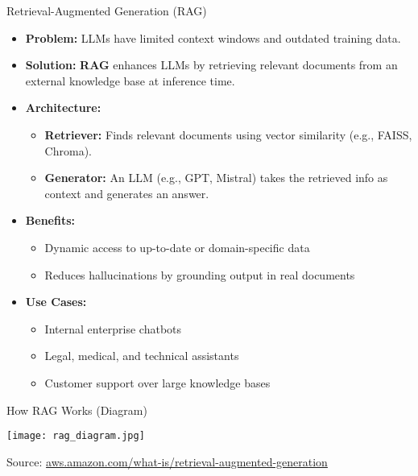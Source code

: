 \documentclass[8pt]{beamer}
\begin{document}
\begin{frame}{Retrieval-Augmented Generation (RAG)}

\begin{itemize}
    \item \textbf{Problem:} LLMs have limited context windows and outdated training data.
    \vspace{0.2cm}
    
    \item \textbf{Solution:} \textbf{RAG} enhances LLMs by retrieving relevant documents from an external knowledge base at inference time.
    \vspace{0.2cm}
    
    \item \textbf{Architecture:}
    \begin{itemize}
        \item \textbf{Retriever:} Finds relevant documents using vector similarity (e.g., FAISS, Chroma).
        \item \textbf{Generator:} An LLM (e.g., GPT, Mistral) takes the retrieved info as context and generates an answer.
    \end{itemize}
    \vspace{0.2cm}
    
    \item \textbf{Benefits:}
    \begin{itemize}
        \item Dynamic access to up-to-date or domain-specific data
        \item Reduces hallucinations by grounding output in real documents
    \end{itemize}
    
    \item \textbf{Use Cases:}
    \begin{itemize}
        \item Internal enterprise chatbots
        \item Legal, medical, and technical assistants
        \item Customer support over large knowledge bases
    \end{itemize}

    
\end{itemize}

\end{frame}

\begin{frame}{How RAG Works (Diagram)}

\centering
\texttt{[image: rag\_diagram.jpg]}

\vspace{0.4cm}
\scriptsize{
Source: \href{https://aws.amazon.com/what-is/retrieval-augmented-generation/}{aws.amazon.com/what-is/retrieval-augmented-generation}
}

\end{frame}
\end{document}
